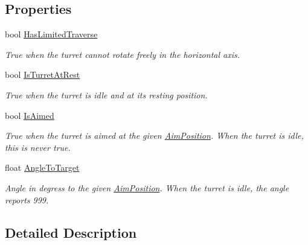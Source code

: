 \subsection*{Properties}
\begin{DoxyCompactItemize}
\item 
bool \hyperlink{class_turret_aim_ac4f7699c9a91fa48dd95b2f08cf03fd6}{Has\+Limited\+Traverse}
\begin{DoxyCompactList}\small\item\em True when the turret cannot rotate freely in the horizontal axis. \end{DoxyCompactList}\item 
bool \hyperlink{class_turret_aim_a1b0a3fd8f069d2364b60591ab3f57e26}{Is\+Turret\+At\+Rest}
\begin{DoxyCompactList}\small\item\em True when the turret is idle and at its resting position. \end{DoxyCompactList}\item 
bool \hyperlink{class_turret_aim_a850d222091cdb64216aa2edc1297a1ba}{Is\+Aimed}
\begin{DoxyCompactList}\small\item\em True when the turret is aimed at the given \hyperlink{class_turret_aim_a194f5413aa939b8cbb8a5a9edf2c8660}{Aim\+Position}. When the turret is idle, this is never true. \end{DoxyCompactList}\item 
float \hyperlink{class_turret_aim_ae9892ac1ac8c471d11d9a99c2849542c}{Angle\+To\+Target}
\begin{DoxyCompactList}\small\item\em Angle in degress to the given \hyperlink{class_turret_aim_a194f5413aa939b8cbb8a5a9edf2c8660}{Aim\+Position}. When the turret is idle, the angle reports 999. \end{DoxyCompactList}\end{DoxyCompactItemize}


\subsection{Detailed Description}


